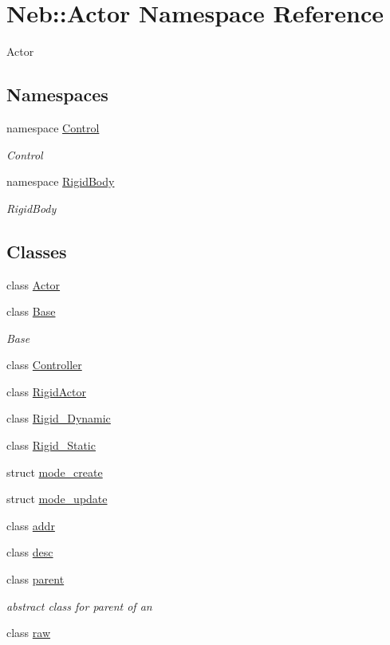 \hypertarget{namespaceNeb_1_1Actor}{\section{\-Neb\-:\-:\-Actor \-Namespace \-Reference}
\label{namespaceNeb_1_1Actor}
}


\-Actor  


\subsection*{\-Namespaces}
\begin{DoxyCompactItemize}
\item 
namespace \hyperlink{namespaceNeb_1_1Actor_1_1Control}{\-Control}
\begin{DoxyCompactList}\small\item\em \-Control \end{DoxyCompactList}\item 
namespace \hyperlink{namespaceNeb_1_1Actor_1_1RigidBody}{\-Rigid\-Body}
\begin{DoxyCompactList}\small\item\em \-Rigid\-Body \end{DoxyCompactList}\end{DoxyCompactItemize}
\subsection*{\-Classes}
\begin{DoxyCompactItemize}
\item 
class \hyperlink{classNeb_1_1Actor_1_1Actor}{\-Actor}
\item 
class \hyperlink{classNeb_1_1Actor_1_1Base}{\-Base}
\begin{DoxyCompactList}\small\item\em \-Base \end{DoxyCompactList}\item 
class \hyperlink{classNeb_1_1Actor_1_1Controller}{\-Controller}
\item 
class \hyperlink{classNeb_1_1Actor_1_1RigidActor}{\-Rigid\-Actor}
\item 
class \hyperlink{classNeb_1_1Actor_1_1Rigid__Dynamic}{\-Rigid\-\_\-\-Dynamic}
\item 
class \hyperlink{classNeb_1_1Actor_1_1Rigid__Static}{\-Rigid\-\_\-\-Static}
\item 
struct \hyperlink{structNeb_1_1Actor_1_1mode__create}{mode\-\_\-create}
\item 
struct \hyperlink{structNeb_1_1Actor_1_1mode__update}{mode\-\_\-update}
\item 
class \hyperlink{classNeb_1_1Actor_1_1addr}{addr}
\item 
class \hyperlink{classNeb_1_1Actor_1_1desc}{desc}
\item 
class \hyperlink{classNeb_1_1Actor_1_1parent}{parent}
\begin{DoxyCompactList}\small\item\em abstract class for parent of an  \end{DoxyCompactList}\item 
class \hyperlink{classNeb_1_1Actor_1_1raw}{raw}
\end{DoxyCompactItemize}

